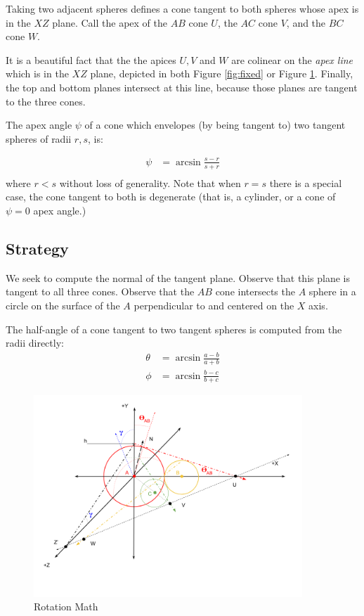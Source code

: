 \documentclass{article}
\begin{document}
Taking two adjacent spheres defines a cone tangent to both spheres whose apex is in the $XZ$ plane.
Call the apex of the $AB$ cone $U$, the $AC$ cone $V$, and the $BC$ cone $W$.

It is a beautiful fact that the the apices $U,V$ and $W$ are colinear
on the {\em apex line} which is in the $XZ$ plane, depicted in both Figure \ref{fig:fixed}
or Figure \ref{fig:rotation}.
Finally, the top and bottom planes
intersect at this line, because those planes are tangent to the three cones.

The apex angle $\psi$ of a cone which envelopes (by being tangent to) two tangent
spheres of radii $r,s$, is:

\begin{align}
 \psi &= \arcsin{\frac{s - r}{s + r}} \\
\end{align}
where $r < s$ without loss of generality. Note that when $r = s$
there is a special case,
the cone tangent to both is degenerate (that is, a cylinder, or a cone of
$\psi = 0$ apex angle.)

\subsection{Strategy}

We seek to compute the normal of the tangent plane.
Observe that this plane is tangent to all three cones.
Observe that the $AB$ cone intersects
the $A$ sphere in a circle on the surface of the $A$ perpendicular to and centered on the $X$ axis.

The half-angle of a cone tangent to two tangent spheres is computed from the radii directly:
\begin{align}
  \theta &= \arcsin{\frac{a - b}{a + b}} \label{eq:theta}\\
  \phi &= \arcsin{\frac{b - c}{b + c}}
\end{align}

\begin{figure}
     \centering
     \includegraphics[width=0.9\textwidth]{figures/RotationMath.png}
     \caption{Rotation Math}
  \label{fig:rotation}
\end{figure}
\end{document}
